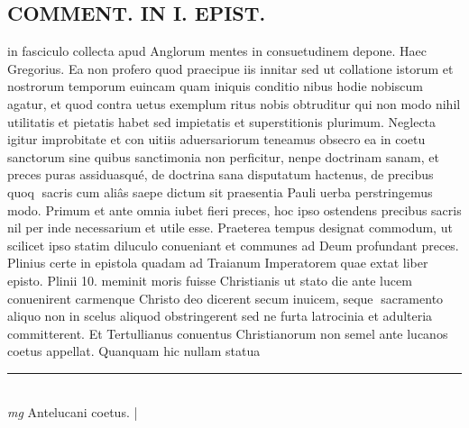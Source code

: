 \documentclass{article}
\begin{document}
\begin{pages}
\section*{COMMENT. IN I. EPIST. }\pstart in fasciculo collecta apud Anglorum mentes in consuetudinem depone. Haec Gregorius. Ea non profero quod praecipue iis innitar sed ut collatione istorum et nostrorum temporum euincam quam iniquis conditio nibus hodie nobiscum agatur, et quod contra uetus exemplum ritus nobis obtruditur qui non modo nihil utilitatis et pietatis habet sed impietatis et superstitionis plurimum. Neglecta igitur improbitate et con uitiis aduersariorum teneamus obsecro ea in coetu sanctorum sine quibus sanctimonia non perficitur, nenpe doctrinam sanam, et preces puras assiduasqué, de doctrina sana disputatum hactenus, de precibus quoq sacris cum aliâs saepe dictum sit praesentia Pauli uerba perstringemus modo. Primum et ante omnia iubet fieri preces, hoc ipso ostendens precibus sacris nil per inde necessarium et utile esse. Praeterea tempus designat commodum, ut scilicet ipso statim diluculo conueniant et communes ad Deum profundant preces. Plinius certe in epistola quadam ad Traianum Imperatorem quae extat liber  episto. Plinii 10. meminit moris fuisse Christianis ut stato die ante lucem conuenirent carmenque Christo deo dicerent secum inuicem, seque sacramento aliquo non in scelus aliquod obstringerent sed ne furta latrocinia et adulteria committerent. Et Tertullianus conuentus Christianorum non semel ante lucanos coetus appellat. Quanquam hic nullam statua\pend
\vspace{0.5cm}\noindent
\vspace{0.2cm}\rule{1cm}{0.2pt}\\ 
\hspace{0.2cm}\textit{mg}
\footnotesize Antelucani coetus. 
\normalsize| 

\end{pages}
\end{document}
